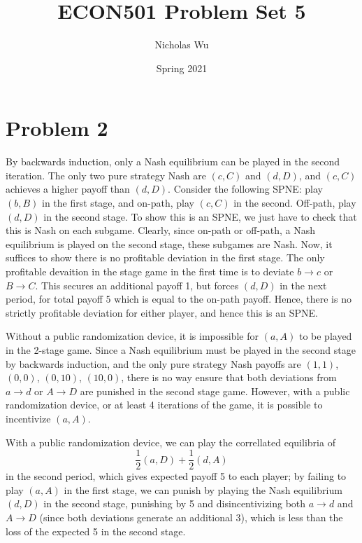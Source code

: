 \documentclass[10pt,letter]{article}
\begin{document}


\title{ECON501 Problem Set 5}

\author{Nicholas Wu}

\date{Spring 2021}

\maketitle

\section*{Problem 2}
By backwards induction, only a Nash equilibrium can be played in the second iteration. The only two pure strategy Nash are $(c, C)$ and $(d, D)$, and $(c,C)$ achieves a higher payoff than $(d, D)$. Consider the following SPNE: play $(b,B)$ in the first stage, and on-path, play $(c,C)$ in the second. Off-path, play $(d,D)$ in the second stage. To show this is an SPNE, we just have to check that this is Nash on each subgame. Clearly, since on-path or off-path, a Nash equilibrium is played on the second stage, these subgames are Nash. Now, it suffices to show there is no profitable deviation in the first stage. The only profitable devaition in the stage game in the first time is to deviate $b \to c$ or $B \to C$. This secures an additional payoff 1, but forces $(d,D)$ in the next period, for total payoff $5$ which is equal to the on-path payoff. Hence, there is no strictly profitable deviation for either player, and hence this is an SPNE.

Without a public randomization device, it is impossible for $(a,A)$ to be played in the 2-stage game. Since a Nash equilibrium must be played in the second stage by backwards induction, and the only pure strategy Nash payoffs are $(1,1)$, $(0,0)$, $(0,10)$, $(10,0)$, there is no way ensure that both deviations from $a \to d$ or $A \to D$ are punished in the second stage game. However, with a public randomization device, or at least 4 iterations of the game, it is possible to incentivize $(a,A)$.

With a public randomization device, we can play the correllated equilibria of
\[ \frac{1}{2}(a,D) + \frac{1}{2}(d,A) \]
in the second period, which gives expected payoff 5 to each player; by failing to play $(a,A)$ in the first stage, we can punish by playing the Nash equilibrium $(d,D)$ in the second stage, punishing by 5 and disincentivizing both $a \to d$ and $A \to D$ (since both deviations generate an additional 3), which is less than the loss of the expected 5 in the second stage.
\end{document}
